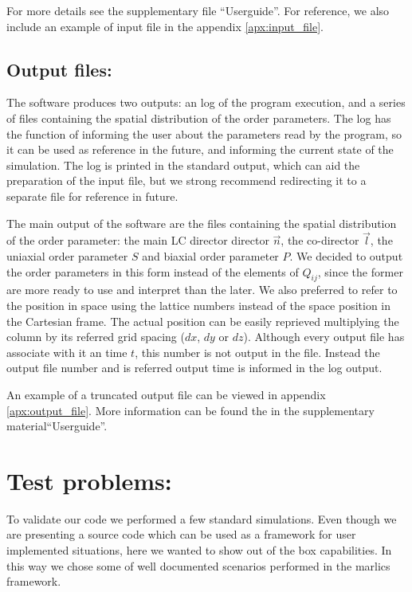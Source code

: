 \documentclass[final,5p,times,twocolumn]{elsarticle}
\begin{document}
For more details see the supplementary file ``Userguide''.  For
reference, we also include an example of input file in the appendix
\ref{apx:input_file}.

\subsection{Output files:}\label{sec:output_files}

The software produces two outputs: an log of the program execution,
and a series of files containing the spatial distribution of the order
parameters. The log has the function of informing the user about the
parameters read by the program, so it can be used as reference in the
future, and informing the current state of the simulation. The log is
printed in the standard output, which can aid the preparation of the
input file, but we strong recommend redirecting it to a separate file
for reference in future.

The main output of the software are the files containing the spatial
distribution of the order parameter: the main LC director director
$\vec{n}$, the co-director $\vec{l}$, the uniaxial order parameter $S$
and biaxial order parameter $P$. We decided to output the order
parameters in this form instead of the elements of $Q_{ij}$, since the
former are more ready to use and interpret than the later.  We also
preferred to refer to the position in space using the lattice numbers
instead of the space position in the Cartesian frame. The actual
position can be easily reprieved multiplying the column by its
referred grid spacing ($dx$, $dy$ or $dz$). Although every output file
has associate with it an time $t$, this number is not output in the
file. Instead the output file number and is referred output time is
informed in the log output. 

An example of a truncated output file
can be viewed in appendix \ref{apx:output_file}.  More information can
be found the in the supplementary material``Userguide''.

\section{Test problems:}\label{sec:testing_marlics}

To validate our code we performed a few standard simulations. Even
though we are presenting a source code which can be used as a
framework for user implemented situations, here we wanted to show out
of the box capabilities. In this way we chose some of well documented
scenarios performed in the marlics framework.
\end{document}
